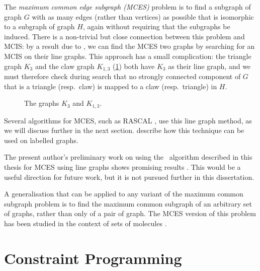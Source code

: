 The \emph{maximum common edge subgraph (MCES)} problem is to find a subgraph of
graph $G$ with as many edges (rather than vertices) as possible that is
isomorphic to a subgraph of graph $H$, again without requiring that the
subgraphs be induced.  There is a non-trivial but close connection between this
problem and MCIS: by a result due to \citet{whitney1932congruent}, we can find
the MCES two graphs by searching for an MCIS on their line graphs.  This
approach has a small complication: the triangle graph $K_3$ and the claw graph
$K_{1,3}$ (\cref{fig:k3-and-claw}) both have $K_3$ as their line graph, and we
must therefore check during search that no strongly connected component of $G$
that is a triangle (resp.\ claw) is mapped to a claw (resp.\ triangle) in $H$.

\begin{figure}[htb]
    \centering
    
    \caption{The graphs $K_3$ and $K_{1,3}$.}
    \label{fig:k3-and-claw}
\end{figure}

Several algorithms for MCES, such as RASCAL
\citep{DBLP:journals/cj/RaymondGW02}, use this line graph method, as we will discuss further
in the next section.  \citet{DBLP:conf/mco/VismaraV08} describe how this technique
can be used on labelled graphs.

The present author's preliminary work on using the \McSplit\ algorithm
described in this thesis for MCES using line graphs shows promising results
\citep{trimble2018three}. This would be a useful direction for future work, but
it is not pursued further in this dissertation.

A generalisation that can be applied to any variant of the maximum common subgraph
problem is to find the maximum common subgraph of an arbitrary set of graphs,
rather than only of a pair of graph.  The MCES version of this problem has
been studied in the context of sets of molecules
\citep{DBLP:journals/jcheminf/DalkeH13}.


\section{Constraint Programming}\label{sec:cp}

